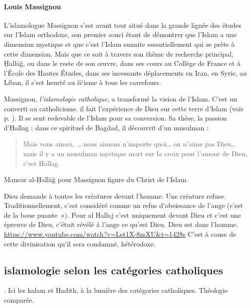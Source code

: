 \paragraph{Louis Massignon}

L’islamologue Massignon s’est avant tout situé dans la grande lignée des études sur l’Islam orthodoxe, son premier souci étant de démontrer que l’Islam a une dimension mystique et que c’est l’Islam sunnite essentiellement qui se prête à cette dimension. Mais que ce soit à travers son thème de recherche principal, Ḥallāğ, ou dans le reste de son œuvre, dans ses cours au Collège de France et à l’École des Hautes Études, dans ses incessants déplacements en Iran, en Syrie, au Liban, il s’est heurté au šī‘isme à tous les carrefours.

Massignon, \emph{l’islamologie catholique}, a transformé la vision de l’Islam. C’est un converti au catholicisme. il fait l’expérience de Dieu sur cette terre d’Islam (voir p. \pageref{fig:Ctesiphon}). Il se sent redevable de l’Islam pour sa conversion. Sa thèse, la passion d’Hallag : dans ce spirituel de Bagdad, il découvrit d’un musulman : 
\begin{quote}
Mais vous aimez, … nous aimons n’importe quoi… on n’aime pas Dieu… mais il y a un musulman mystique mort sur la croix pour l’amour de Dieu, c’est Hallag.
\end{quote}

{Mansur al-Ḥallāğ pour Massignon} figure du Christ de l'Islam.

  Dieu demande à toutes les créatures devant l'homme. Une créature
  refuse. Traditionnellement, c'est considéré comme un refus
  d'obeissance de l'ange (c'est de la boue puante~»). Pour al Hallaj
  c'est uniquement devant Dieu et c'est une épreuve de Dieu, c'était
  révélé à l'ange ce qu'est Dieu. Dieu est dans l'homme.
  \url{https://www.youtube.com/watch?v=Let1X-8zsXU\&t=1428s}
  C'est à cause de cette divinisation qu'il sera condamné, hétérodoxe.



\subsection{ islamologie selon les catégories catholiques}.
Ici les kalam et Hadith, à la lumière des catégories catholiques. Théologie comparée. 

